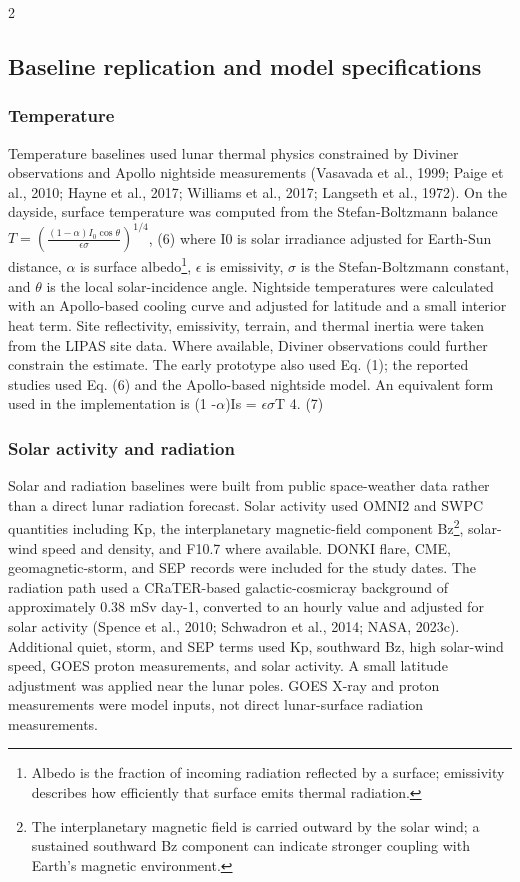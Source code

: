 \begin{multicols*}{2}
\subsection{Baseline replication and model specifications}

\subsubsection{Temperature}

Temperature baselines used lunar thermal physics constrained by Diviner observations and Apollo nightside measurements (Vasavada et al., 1999; Paige et al., 2010; Hayne et al., 2017; Williams et al., 2017; Langseth et al., 1972). On the dayside, surface temperature was computed from the Stefan-Boltzmann balance $T = \left(\frac{(1-\alpha) I_0 \cos\theta}{\epsilon\sigma}\right)^{1/4}$, (6) where I0 is solar irradiance adjusted for Earth-Sun distance, $\alpha$ is surface albedo\footnote{Albedo is the fraction of incoming radiation reflected by a surface; emissivity describes how efficiently that surface emits thermal radiation.}, $\epsilon$ is emissivity, $\sigma$ is the Stefan-Boltzmann constant, and $\theta$ is the local solar-incidence angle. Nightside temperatures were calculated with an Apollo-based cooling curve and adjusted for latitude and a small interior heat term. Site reflectivity, emissivity, terrain, and thermal inertia were taken from the LIPAS site data. Where available, Diviner observations could further constrain the estimate. The early prototype also used Eq. (1); the reported studies used Eq. (6) and the Apollo-based nightside model. An equivalent form used in the implementation is (1 -$\alpha$)Is = $\epsilon$$\sigma$T 4. (7)

\subsubsection{Solar activity and radiation}

Solar and radiation baselines were built from public space-weather data rather than a direct lunar radiation forecast. Solar activity used OMNI2 and SWPC quantities including Kp, the interplanetary magnetic-field component Bz\footnote{The interplanetary magnetic field is carried outward by the solar wind; a sustained southward Bz component can indicate stronger coupling with Earth's magnetic environment.}, solar-wind speed and density, and F10.7 where available. DONKI flare, CME, geomagnetic-storm, and SEP records were included for the study dates. The radiation path used a CRaTER-based galactic-cosmicray background of approximately 0.38 mSv day-1, converted to an hourly value and adjusted for solar activity (Spence et al., 2010; Schwadron et al., 2014; NASA, 2023c). Additional quiet, storm, and SEP terms used Kp, southward Bz, high solar-wind speed, GOES proton measurements, and solar activity. A small latitude adjustment was applied near the lunar poles. GOES X-ray and proton measurements were model inputs, not direct lunar-surface radiation measurements.


\end{multicols*}
